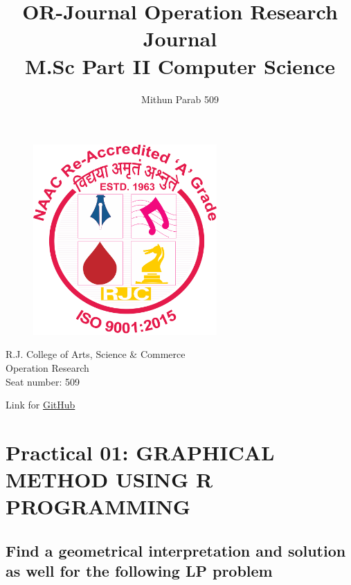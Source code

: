 \documentclass[11pt]{article}
\title{OR-Journal}
\title{\huge{\textbf{ Operation Research Journal}} \\
    \LARGE{M.Sc Part II Computer Science}}
\author{Mithun Parab 509}
\begin{document}
    
\clearpage\maketitle
\thispagestyle{empty}
\begin{center}
    \begin{figure}[h]
        \centering
        \includegraphics[width=7cm]{RJCLG.png}
        \label{fig:logo}
    \end{figure}

    \large{R.J. College of Arts, Science \& Commerce \\
    Operation Research \\
    Seat number: 509
    }
\end{center}
\newpage

\newpage
\tableofcontents
\begin{center}
    Link for \href{https://github.com/Mithunprb/MSc-Practicals-Journals/tree/main/MSc-Part2/OR/Practical}{GitHub}
\end{center}
\newpage
{} %
    
    

    
    \section{Practical 01: \uppercase {Graphical method using R
programming}}\label{practical-01-graphical-method-using-r-programming}

\subsection{Find a geometrical interpretation and solution as well for
the following LP
problem}\label{find-a-geometrical-interpretation-and-solution-as-well-for-the-following-lp-problem}
\end{document}
